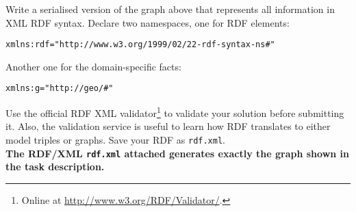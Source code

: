 \documentclass[a4paper, 12pt]{scrartcl}
\begin{document}
\noindent Write a serialised version of the graph above that represents all information in XML RDF syntax. Declare two namespaces, one for RDF elements:
\lstset{language=XML}
\begin{lstlisting}
xmlns:rdf="http://www.w3.org/1999/02/22-rdf-syntax-ns#"
\end{lstlisting}
Another one for the domain-specific facts:
\lstset{language=XML}
\begin{lstlisting}
xmlns:g="http://geo/#"
\end{lstlisting}
Use the official RDF XML validator\footnote{Online at \url{http://www.w3.org/RDF/Validator/}.} to validate your solution before submitting it. Also, the validation service is useful to learn how RDF translates to either model triples or graphs. Save your RDF as \texttt{rdf.xml}. \\

\noindent \textbf{The RDF/XML \texttt{rdf.xml} attached generates exactly the graph shown in the task description.}
\end{document}
